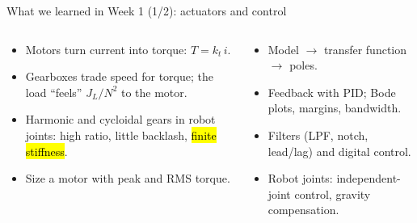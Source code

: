 \documentclass[aspectratio=169,10pt]{beamer}
\begin{document}
\begin{frame}[t]{What we learned in Week 1 (1/2): actuators and control}
\begin{columns}[T,onlytextwidth]
\begin{defbox}
\begin{itemize}\small
\item Motors turn current into torque: $T=k_t\,i$.
\item Gearboxes trade speed for torque; the load ``feels'' $J_L/N^2$ to the motor.
\item Harmonic and cycloidal gears in robot joints: high ratio, little backlash, \hl{finite stiffness}.
\item Size a motor with peak and RMS torque.
\end{itemize}
\end{defbox}
\begin{defbox}[Control -- W1D2 to W1D4]
\begin{itemize}\small
\item Model $\rightarrow$ transfer function $\rightarrow$ poles.
\item Feedback with PID; Bode plots, margins, bandwidth.
\item Filters (LPF, notch, lead/lag) and digital control.
\item Robot joints: independent-joint control, gravity compensation.
\end{itemize}
\end{defbox}
\centering
{}
\end{columns}
\end{frame}
\end{document}
